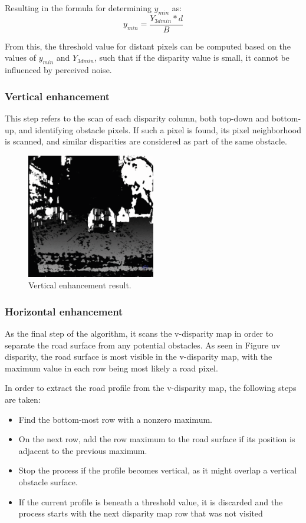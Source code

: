 Resulting in the formula for determining \(y_{min}\) as:
\begin{equation}
    y_{min} = \frac{Y_{3dmin} * d}{B} 
\end{equation}

From this, the threshold value for distant pixels can be computed based on the values of \(y_{min}\) and 
\(Y_{3dmin}\), such that if the disparity value is small, it cannot be influenced by perceived noise.

\subsubsection{Vertical enhancement}

This step refers to the scan of each disparity column, both top-down and bottom-up, and identifying obstacle pixels.
If such a pixel is found, its pixel neighborhood is scanned, and similar disparities are considered as part of the
same obstacle.

\begin{figure}[H]
    \includegraphics[width=0.50\textwidth, height=0.45\textwidth]{resources/png/vertical_enhancement.png}
    \caption{Vertical enhancement result.~\cite{withMain}~\label{figVert}}
\end{figure}

\subsubsection{Horizontal enhancement}

As the final step of the algorithm, it scans the v-disparity map in order to separate the road surface from any 
potential obstacles. As seen in {Figure uv disparity}, the road surface is most visible in the v-disparity map,
with the maximum value in each row being most likely a road pixel.

In order to extract the road profile from the v-disparity map, the following steps are taken:
\begin{itemize}
    \item Find the bottom-most row with a nonzero maximum.
    \item On the next row, add the row maximum to the road surface if its position is adjacent to the previous 
maximum.
    \item Stop the process if the profile becomes vertical, as it might overlap a vertical obstacle surface.
    \item If the current profile is beneath a threshold value, it is discarded and the process starts with the
next disparity map row that was not visited
\end{itemize}

